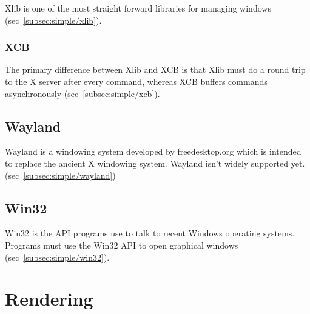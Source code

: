 \documentclass{article}
\begin{document}
Xlib is one of the most straight forward libraries for managing windows
(sec~\ref{subsec:simple/xlib}).

\subsubsection{XCB}
\label{subsubsec:xcb}

The primary difference between Xlib and XCB is that Xlib must do a round trip
to the X server after every command,
whereas XCB buffers commands asynchronously (sec~\ref{subsec:simple/xcb}).


\subsection{Wayland}
\label{subsec:wayland}

Wayland is a windowing system developed by freedesktop.org which is intended to
replace the ancient X windowing system.
Wayland isn't widely supported yet.
(sec~\ref{subsec:simple/wayland})


\subsection{Win32}
\label{subsec:win32}

Win32 is the API programs use to talk to recent Windows operating systems.
Programs must use the Win32 API to open graphical windows
(sec~\ref{subsec:simple/win32}).


\pagebreak
\section{Rendering}
\label{sec:rendering}

\end{document}
